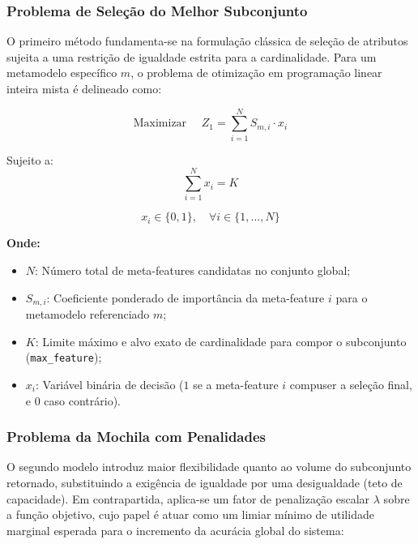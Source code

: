 \documentclass[12pt]{article}
\begin{document}
\subsubsection{Problema de Seleção do Melhor Subconjunto}

O primeiro método fundamenta-se na formulação clássica de seleção de atributos sujeita a uma restrição de igualdade estrita para a cardinalidade. Para um metamodelo específico $m$, o problema de otimização em programação linear inteira mista é delineado como:

\begin{equation} \label{eq:obj_subset}
\text{Maximizar } \quad Z_1 = \sum_{i=1}^{N} S_{m,i} \cdot x_i
\end{equation}

Sujeito a:
\begin{equation} \label{eq:rest_subset}
\sum_{i=1}^{N} x_i = K
\end{equation}

\begin{equation}
x_i \in \{0, 1\}, \quad \forall i \in \{1, \dots, N\}
\end{equation}

\noindent \textbf{Onde:}
\begin{itemize}
    \itemsep0em
    \item $N$: Número total de meta-features candidatas no conjunto global;
    \item $S_{m,i}$: Coeficiente ponderado de importância da meta-feature $i$ para o metamodelo referenciado $m$;
    \item $K$: Limite máximo e alvo exato de cardinalidade para compor o subconjunto (\texttt{max\_feature});
    \item $x_i$: Variável binária de decisão ($1$ se a meta-feature $i$ compuser a seleção final, e $0$ caso contrário).
\end{itemize}


\subsubsection{Problema da Mochila com Penalidades}

O segundo modelo introduz maior flexibilidade quanto ao volume do subconjunto retornado, substituindo a exigência de igualdade por uma desigualdade (teto de capacidade). Em contrapartida, aplica-se um fator de penalização escalar $\lambda$ sobre a função objetivo, cujo papel é atuar como um limiar mínimo de utilidade marginal esperada para o incremento da acurácia global do sistema:
\end{document}
